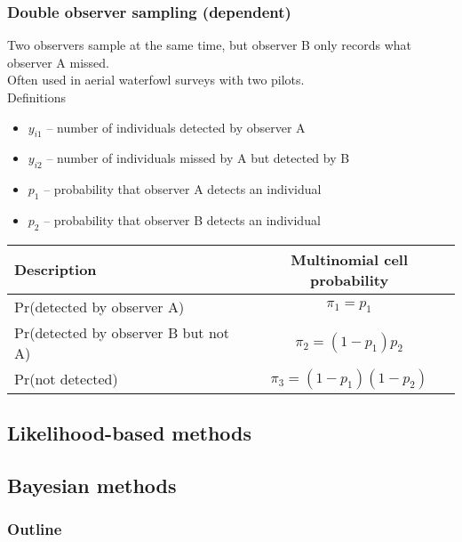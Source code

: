 \documentclass[color=usenames,dvipsnames]{beamer}\usepackage[]{graphicx}\usepackage[]{color}
\begin{document}
\begin{frame}
  \frametitle{Double observer sampling (dependent)}
  \small
  Two observers sample at the same time, but observer B only records
  what observer A missed. \\
  \pause
  \vfill
  Often used in aerial waterfowl surveys with two pilots. \\
  \pause
  \vfill
  Definitions
  \begin{itemize}
    \setlength\itemsep{1pt}
    \item $y_{i1}$ -- number of individuals detected by observer A
    \item $y_{i2}$ -- number of individuals missed by A but
      detected by B
    \item $p_1$ -- probability that observer A detects an individual 
    \item $p_2$ -- probability that observer B detects an individual 
  \end{itemize}
  \pause \vfill
  \footnotesize
  \begin{tabular}{lc}
    \hline
    \centering
    Description & Multinomial cell probability \\
    \hline
    Pr(detected by observer A) & $\pi_1 = p_1$ \\
    Pr(detected by observer B but not A) & $\pi_2 = (1-p_1)p_2$ \\
    Pr(not detected) & $\pi_3 = (1-p_1)(1-p_2)$ \\
    \hline
  \end{tabular}
\end{frame}

\subsection{Likelihood-based methods}


\subsection{Bayesian methods}



\begin{frame}[plain]
  \frametitle{Outline}
  \Large
\end{frame}
\end{document}
